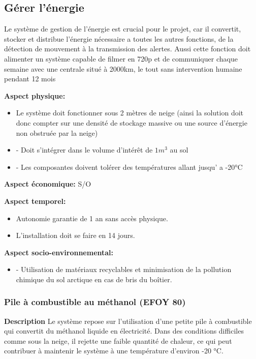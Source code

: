 
\subsection{Gérer l'énergie}
\label{GérerLÉnergie}
Le système de gestion de l’énergie est crucial pour le projet, car il convertit, stocker et distribue l’énergie nécessaire a toutes les autres fonctions, de la détection de mouvement à la transmission des alertes. Aussi cette fonction doit alimenter un système capable de filmer en 720p et de communiquer chaque semaine avec une centrale situé à 2000km, le tout sans intervention humaine pendant 12 mois

\bigskip

\noindent\textbf{Aspect physique:}
\begin{itemize}
    \item Le système doit fonctionner sous 2 mètres de neige (ainsi la solution doit donc compter sur une densité de stockage massive ou une source d’énergie non obstruée par la neige)
    \item -	Doit s’intégrer dans le volume d’intérêt de $1m^3$ au sol
    \item -	Les composantes doivent tolérer des températures allant jusqu’ a -20°C
\end{itemize}

\noindent\textbf{Aspect économique:} S/O

\noindent\textbf{Aspect temporel:}
\begin{itemize}
    \item Autonomie garantie de 1 an sans accès physique.
    \item L’installation doit se faire en 14 jours.
\end{itemize}

\noindent\textbf{Aspect socio-environnemental:}
\begin{itemize}
    \item -	Utilisation de matériaux recyclables et minimisation de la pollution chimique du sol arctique en cas de bris du boîtier.
\end{itemize}


\subsubsection{Pile à combustible au méthanol (EFOY 80)}
\noindent\textbf{Description} Le système repose sur l’utilisation d’une petite pile à combustible qui convertit du méthanol liquide en électricité. Dans des conditions difficiles comme sous la neige, il rejette une faible quantité de chaleur, ce qui peut contribuer à maintenir le système à une température d’environ -20 °C. 
\\

